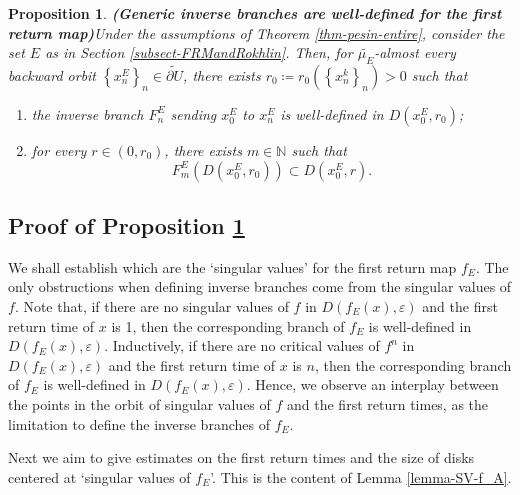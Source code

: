 \documentclass[11pt]{article}
\newtheorem{prop}[thm]{Proposition}
\theoremstyle{definition}
\theoremstyle{remark}
\theoremstyle{plain}
\begin{document}
\begin{prop}{\bf (Generic inverse branches are well-defined for the first return map)}\label{prop65}
	Under the assumptions of Theorem \ref{thm-pesin-entire}, consider the set $E$ as in Section \ref{subsect-FRMandRokhlin}. Then,  for $ \widetilde{\mu_E} $-almost every backward orbit $ \left\lbrace x^E_n\right\rbrace _n \in \widetilde{\partial U}$, there exists $ r_0\coloneqq r_0(\left\lbrace x^k_n\right\rbrace _n)>0 $ such that
	\begin{enumerate}[label={\em (\roman*)}]
		\item the inverse branch $ F^E_n $ sending $x^E_0 $ to $ x^E_n $ is well-defined in $ D(x^E_0,r_0) $;
		\item  for every $ r\in (0, r_0)$, there exists $ m\in\mathbb{N} $ such that \[F^E_m(D(x^E_0, r_0))\subset D(x^E_0, r).\]
	\end{enumerate}
\end{prop}


\subsection{Proof of Proposition \ref{prop65}}

We shall establish which are the `singular values' for the first return map $ f_{E}$. The only obstructions when defining inverse branches come from the singular values of $ f $. Note that, if there are no singular values of $ f $ in $ D(f_{E}(x), \varepsilon) $ and the first return time of $ x $ is 1, then the corresponding branch of $ f_{E} $ is well-defined in $ D(f_{E}(x), \varepsilon) $. Inductively,  if there are no critical values of $ f^n $ in $ D(f_{E}(x), \varepsilon) $ and the first return time of $ x $ is $ n $, then the corresponding branch of $ f_{E} $ is well-defined in $ D(f_{E}(x), \varepsilon) $. Hence, we observe an interplay between the points in the orbit of singular values of $ f $ and the first return times, as the limitation to define the inverse branches of $ f_{E} $.

Next we aim to give estimates on the first return times and the size of disks centered at `singular values of $ f_{E}$'. This is the content of Lemma \ref{lemma-SV-f_A}.
\end{document}
